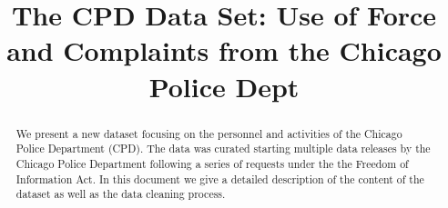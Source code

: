 \documentclass{article}
\title{The CPD Data Set: Use of Force and Complaints from the Chicago Police Dept}
\begin{document}
\maketitle

\begin{abstract}
	We present a new dataset focusing on the personnel and activities of the
	Chicago Police Department (CPD). The data was curated starting multiple
	data releases by the Chicago Police Department following a series of
	requests under the the Freedom of Information Act. In this document we give
	a detailed description of the content of the dataset as well as the data
	cleaning process.
\end{abstract}










\end{document}
